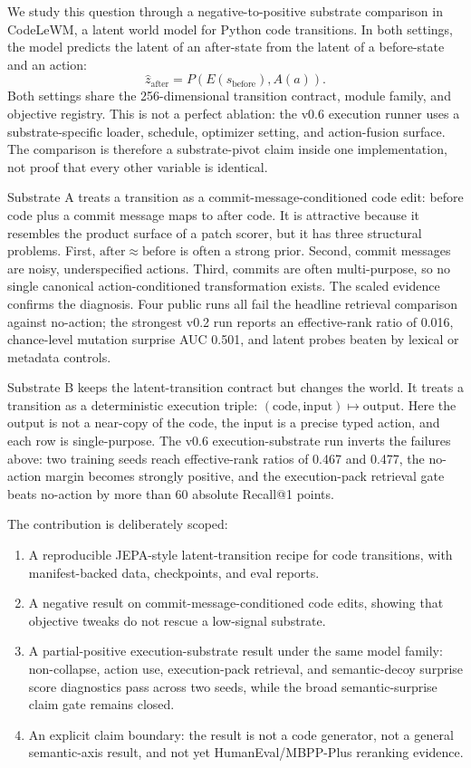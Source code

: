 \documentclass[11pt]{article}
\newcommand{\modelname}{CodeLeWM}
\newcommand{\subA}{Substrate A}
\newcommand{\subB}{Substrate B}
\begin{document}
We study this question through a negative-to-positive substrate comparison in
\modelname, a latent world model for Python code transitions. In both settings,
the model predicts the latent of an after-state from the latent of a before-state
and an action:
\begin{equation}
  \hat z_{\mathrm{after}} =
  P(E(s_{\mathrm{before}}), A(a)).
\end{equation}
Both settings share the 256-dimensional transition contract, module family, and
objective registry. This is not a perfect ablation: the v0.6 execution runner
uses a substrate-specific loader, schedule, optimizer setting, and action-fusion
surface. The comparison is therefore a substrate-pivot claim inside one
implementation, not proof that every other variable is identical.

\subA{} treats a transition as a commit-message-conditioned code edit: before
code plus a commit message maps to after code. It is attractive because it
resembles the product surface of a patch scorer, but it has three structural
problems. First,
\(\mathrm{after} \approx \mathrm{before}\) is often a strong prior. Second,
commit messages are noisy, underspecified actions. Third, commits are often
multi-purpose, so no single canonical action-conditioned transformation exists.
The scaled evidence confirms the diagnosis. Four public runs all fail the
headline retrieval comparison against no-action; the strongest v0.2 run reports
an effective-rank ratio of 0.016, chance-level mutation surprise AUC 0.501, and
latent probes beaten by lexical or metadata controls.

\subB{} keeps the latent-transition contract but changes the world. It treats a
transition as a deterministic execution triple:
\((\mathrm{code}, \mathrm{input}) \mapsto \mathrm{output}\). Here the output is
not a near-copy of the code, the input is a precise typed action, and each row is
single-purpose. The v0.6 execution-substrate run inverts the failures above:
two training seeds reach effective-rank ratios of 0.467 and 0.477, the
no-action margin becomes strongly positive, and the execution-pack retrieval
gate beats no-action by more than 60 absolute Recall@1 points.

The contribution is deliberately scoped:
\begin{enumerate}[leftmargin=1.5em]
  \item A reproducible JEPA-style latent-transition recipe for code transitions,
  with manifest-backed data, checkpoints, and eval reports.
  \item A negative result on commit-message-conditioned code edits,
  showing that objective tweaks do not rescue a low-signal substrate.
  \item A partial-positive execution-substrate result under the same model
  family: non-collapse, action use, execution-pack retrieval, and
  semantic-decoy surprise score diagnostics pass across two seeds, while the
  broad semantic-surprise claim gate remains closed.
  \item An explicit claim boundary: the result is not a code generator, not a
  general semantic-axis result, and not yet HumanEval/MBPP-Plus reranking
  evidence.
\end{enumerate}
\end{document}
